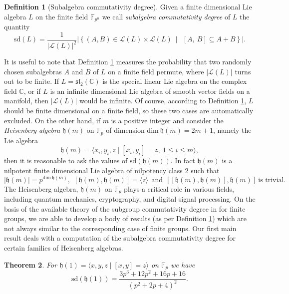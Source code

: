 \documentclass{amsart}
\newtheorem{theorem}{Theorem}[section]
\theoremstyle{definition}
\newtheorem{definition}[theorem]{Definition}
\numberwithin{equation}{section}
\begin{document}
\begin{definition}[Subalgebra commutativity degree]\label{sdl}Given a finite dimensional Lie algebra $L$ on the finite field $\mathbb{F}_{p^n}$ we call  \textit{subalgebra  commutativity degree} of $L$  the quantity 
\[
\mathrm{sd}(L)  =\frac{1}{|\mathcal{L}(L)|^2}\left|\left\{(A, B) \in \mathcal{L}(L) \times  \mathcal{L}(L)\  \mid \ \ [A, \  B] \subseteq A+B   \right\}\right|. 
\]
\end{definition} 

It is useful to note that  Definition \ref{sdl} measures the  probability that two randomly chosen subalgebras $A$ and $B$ of $L$ on a finite field permute, where $|\mathcal{L}(L)|$  turns out to be finite.   If  $L= \mathfrak{sl}_2(\mathbb{C})$ is the special linear Lie algebra on the complex field $\mathbb{C}$,  or  if $L$ is an infinite dimensional Lie algebra of smooth vector fields on a manifold, then $|\mathcal{L}(L)|$ would be infinite. Of course, according to Definition \ref{sdl}, $L$ should be finite dimensional on a finite field, so these two cases are automatically excluded. On the other hand, if  $m$ is a positive integer and consider the \textit{Heisenberg algebra}  $\mathfrak{h}(m)$ on $\mathbb{F}_p$ of dimension $\mathrm{dim} \ \mathfrak{h}(m)=2m+1$, namely the Lie algebra
\[\mathfrak{h}(m) = \langle x_i, y_i, z \mid [x_i, y_i] = z,  \ 1 \leq i \leq m\rangle,\]
then it is reasonable to ask the values of $\mathrm{sd}(\mathfrak{h}(m))$. In fact $\mathfrak{h}(m)$  is a nilpotent finite dimensional Lie algebra of nilpotency class 2 such that \[|\mathfrak{h}(m)|=p^{\mathrm{dim} \ \mathfrak{h}(m)}, \ \ [\mathfrak{h}(m), \mathfrak{h}(m)]=\langle z\rangle  \ \ \mbox{and} \ \ [[\mathfrak{h}(m), \mathfrak{h}(m)], \mathfrak{h}(m)] \  \mbox{is trivial}.\] The Heisenberg algebra, $\mathfrak{h}(m)$ on  $\mathbb{F}_p$ plays a critical role in various fields, including quantum mechanics, cryptography, and digital signal processing.  
On the basis of the available theory of the subgroup commutativity degree in \cite{farrokhi1, farrokhi2,   sr1, sr2, or, mt} for finite groups, we are able to develop a body of results (as per Definition \ref{sdl}) which are not always similar to the corresponding case of finite groups.  
Our first main result deals with a computation of the subalgebra commutativity degree for certain families of Heisenberg algebras.
\begin{theorem} \label{heisenberg}
   For  \(\mathfrak{h}(1)=\langle x,y,z \mid [x,y]=z\rangle \) on \(\mathbb{F}_{p}\) we have 
   $$\mathrm{sd}(\mathfrak{h}(1))=\frac{3p^3+12p^2+16p+16}{{(p^2+2p+4)^2}}.$$
\end{theorem}
\end{document}
